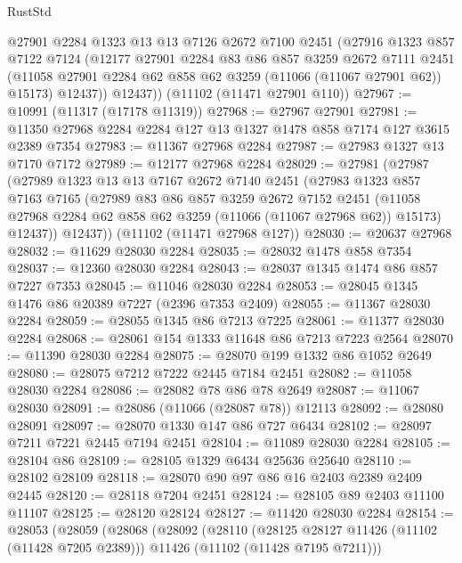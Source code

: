 \begin{lexlean}{RustStd}
\begin{coremodule}
        @27901
        @2284
        @1323
        @13
        @13
        @7126
        @2672
        @7100
        @2451
        (@27916
          @1323
          @857
          @7122
          @7124
          (@12177
            @27901
            @2284
            @83
            @86
            @857
            @3259
            @2672
            @7111
            @2451
            (@11058 @27901 @2284 @62 @858 @62 @3259 (@11066 (@11067 @27901 @62)) @15173)
            @12437))
        @12437))
    (@11102 (@11471 @27901 @110))
@27967 := @10991 (@11317 (@17178 @11319))
@27968 := @27967 @27901
@27981 := @11350 @27968 @2284 @2284 @127 @13 @1327 @1478 @858 @7174 @127 @3615 @2389 @7354
@27983 := @11367 @27968 @2284
@27987 := @27983 @1327 @13 @7170 @7172
@27989 := @12177 @27968 @2284
@28029 := @27981
    (@27987
      (@27989
        @1323
        @13
        @13
        @7167
        @2672
        @7140
        @2451
        (@27983
          @1323
          @857
          @7163
          @7165
          (@27989
            @83
            @86
            @857
            @3259
            @2672
            @7152
            @2451
            (@11058 @27968 @2284 @62 @858 @62 @3259 (@11066 (@11067 @27968 @62)) @15173)
            @12437))
        @12437))
    (@11102 (@11471 @27968 @127))
@28030 := @20637 @27968
@28032 := @11629 @28030 @2284
@28035 := @28032 @1478 @858 @7354
@28037 := @12360 @28030 @2284
@28043 := @28037 @1345 @1474 @86 @857 @7227 @7353
@28045 := @11046 @28030 @2284
@28053 := @28045 @1345 @1476 @86 @20389 @7227 (@2396 @7353 @2409)
@28055 := @11367 @28030 @2284
@28059 := @28055 @1345 @86 @7213 @7225
@28061 := @11377 @28030 @2284
@28068 := @28061 @154 @1333 @11648 @86 @7213 @7223 @2564
@28070 := @11390 @28030 @2284
@28075 := @28070 @199 @1332 @86 @1052 @2649
@28080 := @28075 @7212 @7222 @2445 @7184 @2451
@28082 := @11058 @28030 @2284
@28086 := @28082 @78 @86 @78 @2649
@28087 := @11067 @28030
@28091 := @28086 (@11066 (@28087 @78)) @12113
@28092 := @28080 @28091
@28097 := @28070 @1330 @147 @86 @727 @6434
@28102 := @28097 @7211 @7221 @2445 @7194 @2451
@28104 := @11089 @28030 @2284
@28105 := @28104 @86
@28109 := @28105 @1329 @6434 @25636 @25640
@28110 := @28102 @28109
@28118 := @28070 @90 @97 @86 @16 @2403 @2389 @2409 @2445
@28120 := @28118 @7204 @2451
@28124 := @28105 @89 @2403 @11100 @11107
@28125 := @28120 @28124
@28127 := @11420 @28030 @2284
@28154 := @28053
    (@28059
      (@28068
        (@28092
          (@28110
            (@28125 @28127 @11426 (@11102 (@11428 @7205 @2389)))
            @11426
            (@11102 (@11428 @7195 @7211)))

\end{coremodule}
\end{lexlean}
